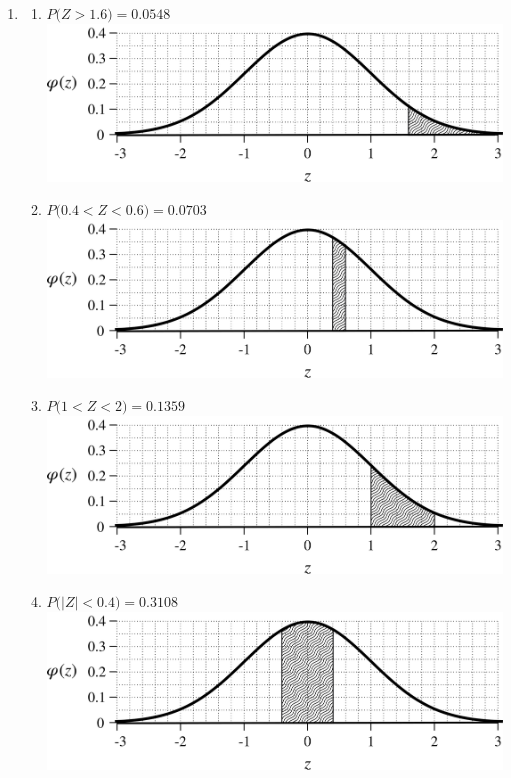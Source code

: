 \documentclass[12pt,letterpaper]{article}
\begin{document}
\begin{multicols}{2}
\begin{enumerate}
\item \begin{enumerate}
\item $P\bigl(Z > 1.6\bigr) = 0.0548 $\\\includegraphics[scale=0.4]{g1p6.png}
\item $P\bigl(0.4 < Z < 0.6\bigr) = 0.0703 $\\\includegraphics[scale=0.4]{bp4p6.png}
\item $P\bigl(1 < Z < 2\bigr) = 0.1359 $\\\includegraphics[scale=0.4]{b1a2.png}
\item $P\bigl(|Z| < 0.4\bigr) = 0.3108 $\\\includegraphics[scale=0.4]{alp4.png}

\end{enumerate}
\end{enumerate}
\end{multicols}
\end{document}
